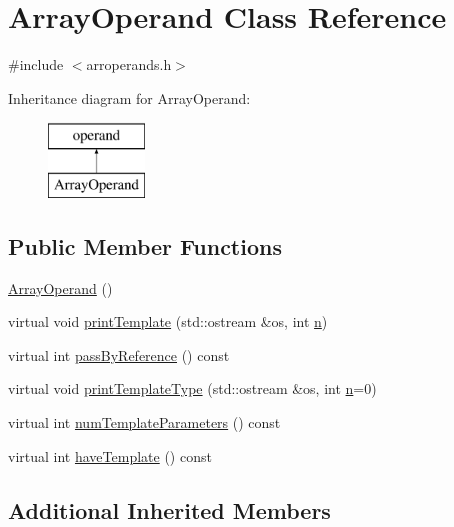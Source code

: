 \hypertarget{classArrayOperand}{}\section{Array\+Operand Class Reference}
\label{classArrayOperand}


{\ttfamily \#include $<$arroperands.\+h$>$}

Inheritance diagram for Array\+Operand\+:\begin{figure}[H]
\begin{center}
\leavevmode
\includegraphics[height=2.000000cm]{classArrayOperand}
\end{center}
\end{figure}
\subsection*{Public Member Functions}
\begin{DoxyCompactItemize}
\item 
\hyperlink{classArrayOperand_ac3d03eae09c0c479cc92df430a994a0d}{Array\+Operand} ()
\item 
virtual void \hyperlink{classArrayOperand_a391b3ab58751bd5a933b823f959d7e3b}{print\+Template} (std\+::ostream \&os, int \hyperlink{indexexpr_8h_ab427e2e2b4d6cec55fa088ea2a692ace}{n})
\item 
virtual int \hyperlink{classArrayOperand_abfa71b5bcc2e238c1c8ad1aa101ce1db}{pass\+By\+Reference} () const 
\item 
virtual void \hyperlink{classArrayOperand_acdcc6d475b49e56ef29105fdd7c6d368}{print\+Template\+Type} (std\+::ostream \&os, int \hyperlink{indexexpr_8h_ab427e2e2b4d6cec55fa088ea2a692ace}{n}=0)
\item 
virtual int \hyperlink{classArrayOperand_a2ddc2e123eef28466254a0754890c843}{num\+Template\+Parameters} () const 
\item 
virtual int \hyperlink{classArrayOperand_a74d459f5b330eb677867c2d0e3ec1df2}{have\+Template} () const 
\end{DoxyCompactItemize}
\subsection*{Additional Inherited Members}


